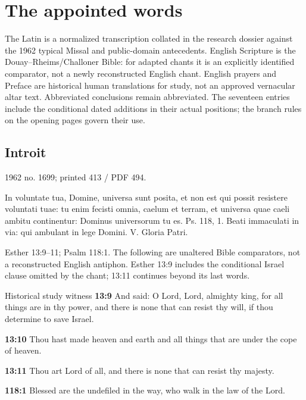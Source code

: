 \section{The appointed words}

The Latin is a normalized transcription collated in the research dossier against the 1962 typical Missal and public-domain antecedents. English Scripture is the Douay–Rheims/Challoner Bible: for adapted chants it is an explicitly identified comparator, not a newly reconstructed English chant. English prayers and Preface are historical human translations for study, not an approved vernacular altar text. Abbreviated conclusions remain abbreviated. The seventeen entries include the conditional dated additions in their actual positions; the branch rules on the opening pages govern their use.

\subsection{Introit}
\label{proper-introit}

1962 no. 1699; printed 413 / PDF 494.

\begin{latinproper}
In voluntate tua, Domine, universa sunt posita, et non est qui possit resistere voluntati tuae: tu enim fecisti omnia, caelum et terram, et universa quae caeli ambitu continentur: Dominus universorum tu es. Ps. 118, 1. Beati immaculati in via: qui ambulant in lege Domini. V. Gloria Patri.
\end{latinproper}

Esther 13:9–11; Psalm 118:1. The following are unaltered Bible comparators, not a reconstructed English antiphon. Esther 13:9 includes the conditional Israel clause omitted by the chant; 13:11 continues beyond its last words.

\begin{englishwitness}{Historical study witness}
\textbf{13:9} And said: O Lord, Lord, almighty king, for all things are in thy power, and there is none that can resist thy will, if thou determine to save Israel.

\textbf{13:10} Thou hast made heaven and earth and all things that are under the cope of heaven.

\textbf{13:11} Thou art Lord of all, and there is none that can resist thy majesty.

\textbf{118:1} Blessed are the undefiled in the way, who walk in the law of the Lord.
\end{englishwitness}

